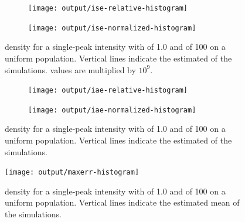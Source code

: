 \begin{figure}[htbp]
    \centering
    \begin{subfigure}[b]{0.45\textwidth}
        \texttt{[image: output/ise-relative-histogram]}
    \end{subfigure}
    \begin{subfigure}[b]{0.45\textwidth}
        \texttt{[image: output/ise-normalized-histogram]}
    \end{subfigure}
    \caption[: Single-peak of 100 on uniform population]{ density for a single-peak intensity with  of 1.0 and  of 100 on a uniform population. Vertical lines indicate the estimated  of the simulations.  values are multiplied by $10^9$.}
    \label{fig:ise:unif_100_1.0_1h}
\end{figure}

\begin{figure}[htbp]
    \centering
    \begin{subfigure}[b]{0.45\textwidth}
        \texttt{[image: output/iae-relative-histogram]}
    \end{subfigure}
    \begin{subfigure}[b]{0.45\textwidth}
        \texttt{[image: output/iae-normalized-histogram]}
    \end{subfigure}
    \caption[: Single-peak of 100 on uniform population]{ density for a single-peak intensity with  of 1.0 and  of 100 on a uniform population. Vertical lines indicate the estimated  of the simulations.}
    \label{fig:iae:unif_100_1.0_1h}
\end{figure}

\begin{figure}[htbp]
    \centering
    \texttt{[image: output/maxerr-histogram]}
    \caption[: Single-peak of 100 on uniform population]{ density for a single-peak intensity with  of 1.0 and  of 100 on a uniform population. Vertical lines indicate the estimated mean  of the simulations.}
    \label{fig:maxerr:unif_100_1.0_1h}
\end{figure}


